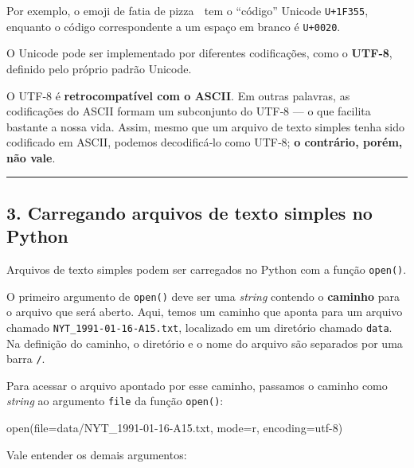 \documentclass[
  brazilian,
  11pt,
]{article}
\newenvironment{Shaded}{\begin{snugshade}}{\end{snugshade}}
\newcommand{\BuiltInTok}[1]{\textcolor[rgb]{0.50,0.55,0.55}{#1}}
\newcommand{\NormalTok}[1]{\textcolor[rgb]{0.81,0.81,0.76}{#1}}
\newcommand{\OperatorTok}[1]{\textcolor[rgb]{0.81,0.81,0.76}{#1}}
\newcommand{\StringTok}[1]{\textcolor[rgb]{0.96,0.31,0.31}{#1}}
\let\oldtexttt\texttt
\renewcommand{\texttt}[1]{{\color{inlink}\oldtexttt{#1}}}
\begin{document}
Por exemplo, o emoji de fatia de pizza 🍕 tem o ``código'' Unicode
\texttt{U+1F355}, enquanto o código correspondente a um espaço em branco
é \texttt{U+0020}.

O Unicode pode ser implementado por diferentes codificações, como o
\textbf{UTF‑8}, definido pelo próprio padrão Unicode.

O UTF‑8 é \textbf{retrocompatível com o ASCII}. Em outras palavras, as
codificações do ASCII formam um subconjunto do UTF‑8 --- o que facilita
bastante a nossa vida. Assim, mesmo que um arquivo de texto simples
tenha sido codificado em ASCII, podemos decodificá‑lo como UTF‑8;
\textbf{o contrário, porém, não vale}.

\begin{center}\rule{0.5\linewidth}{0.5pt}\end{center}

\subsection{3. Carregando arquivos de texto simples no
Python}\label{carregando-arquivos-de-texto-simples-no-python}

Arquivos de texto simples podem ser carregados no Python com a função
\texttt{open()}.

O primeiro argumento de \texttt{open()} deve ser uma \emph{string}
contendo o \textbf{caminho} para o arquivo que será aberto. Aqui, temos
um caminho que aponta para um arquivo chamado
\texttt{NYT\_1991-01-16-A15.txt}, localizado em um diretório chamado
\texttt{data}. Na definição do caminho, o diretório e o nome do arquivo
são separados por uma barra \texttt{/}.

Para acessar o arquivo apontado por esse caminho, passamos o caminho
como \emph{string} ao argumento \texttt{file} da função \texttt{open()}:

\begin{Shaded}
\begin{Highlighting}[]
\BuiltInTok{open}\NormalTok{(}\BuiltInTok{file}\OperatorTok{=}\StringTok{\textquotesingle{}data/NYT\_1991{-}01{-}16{-}A15.txt\textquotesingle{}}\NormalTok{, mode}\OperatorTok{=}\StringTok{\textquotesingle{}r\textquotesingle{}}\NormalTok{, encoding}\OperatorTok{=}\StringTok{\textquotesingle{}utf{-}8\textquotesingle{}}\NormalTok{)}
\end{Highlighting}
\end{Shaded}

Vale entender os demais argumentos:
\end{document}
